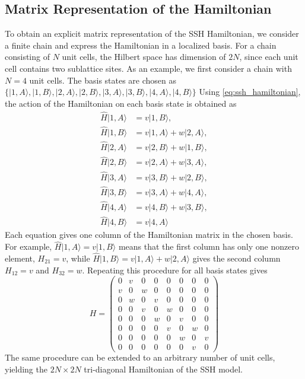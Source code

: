 \documentclass[11pt, a4paper]{article}
\begin{document}
\subsection{Matrix Representation of the Hamiltonian}
To obtain an explicit matrix representation of the SSH Hamiltonian, we consider a finite chain and express the Hamiltonian in a localized basis.
For a chain consisting of $N$ unit cells, the Hilbert space has dimension of $2N$, since each unit cell contains two sublattice sites.
As an example, we first consider a chain with $N=4$ unit cells.
The basis states are chosen as $\{|1,A\rangle,|1,B\rangle,|2,A\rangle,|2,B\rangle,|3,A\rangle,|3,B\rangle,|4,A\rangle,|4,B\rangle\}$
Using \cref{eq:ssh_hamiltonian}, the action of the Hamiltonian on each basis state is obtained as 
\begin{align*}
    \hat H |1,A\rangle &= v|1,B\rangle,\\
    \hat H|1,B\rangle &= v|1,A\rangle + w|2,A\rangle,\\
    \hat H|2,A\rangle &= v|2,B\rangle + w|1,B\rangle,\\
    \hat H|2,B\rangle &= v|2,A\rangle + w|3,A\rangle,\\
    \hat H|3,A\rangle &= v|3,B\rangle + w|2,B\rangle,\\
    \hat H|3,B\rangle &= v|3,A\rangle + w|4,A\rangle,\\
    \hat H|4,A\rangle &= v|4,B\rangle + w|3,B\rangle,\\
    \hat H|4,B\rangle &= v|4,A\rangle
\end{align*}
Each equation gives one column of the Hamiltonian matrix in the chosen basis. For example,
$\hat{H}|1,A\rangle = v|1,B\rangle$ means that the first column has only one nonzero element, $H_{21}=v$, while $\hat{H}|1,B\rangle = v|1,A\rangle + w|2,A\rangle$ gives the second column $H_{12}=v$ and $H_{32}=w$.
Repeating this procedure for all basis states gives
\begingroup
\renewcommand{\arraystretch}{1.15}
\begin{equation*}
H=
\begin{pmatrix}
0 & v & 0 & 0 & 0 & 0 & 0 & 0\\
v & 0 & w & 0 & 0 & 0 & 0 & 0\\
0 & w & 0 & v & 0 & 0 & 0 & 0\\
0 & 0 & v & 0 & w & 0 & 0 & 0\\
0 & 0 & 0 & w & 0 & v & 0 & 0\\
0 & 0 & 0 & 0 & v & 0 & w & 0\\
0 & 0 & 0 & 0 & 0 & w & 0 & v\\
0 & 0 & 0 & 0 & 0 & 0 & v & 0
\end{pmatrix}
\end{equation*}
\endgroup
The same procedure can be extended to an arbitrary number of unit cells, yielding the $2N\times2N$ tri-diagonal Hamiltonian of the SSH model.
\end{document}

